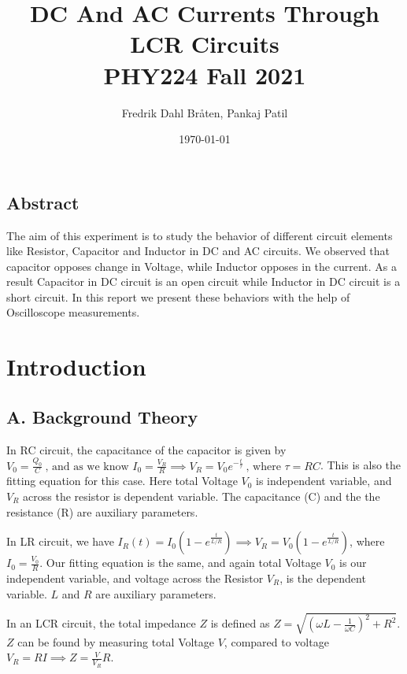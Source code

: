 \documentclass[a4paper,12pt]{article}
\begin{document}
\title{DC And AC Currents Through LCR Circuits \\
\large PHY224 Fall 2021}
\author{Fredrik Dahl Bråten, Pankaj Patil}
\date{\today}
\maketitle
\begin{center}
	\section*{Abstract}
\end{center}
The aim of this experiment is  to study the behavior of different  circuit elements like 
Resistor, Capacitor and Inductor in DC and AC circuits. We observed that capacitor opposes
change in Voltage, while Inductor opposes in the current. As a result Capacitor in DC circuit is an open
circuit while Inductor in DC circuit is a short circuit. In this report we present 
these behaviors with the help of Oscilloscope measurements.

\section{Introduction}

\subsection*{A. Background Theory}
In RC circuit, the capacitance of the capacitor is given by $V_0 = \frac{Q_0}{C} \ \text{, and as we know  } I_0 = \frac{V_R}{R} \implies V_R = V_0e^{-\frac{t}{\tau}}\ \text{, where } \tau = RC$. This is also 
the fitting equation for this case. Here total Voltage $V_0$ is independent variable, and $V_R$ across the resistor is dependent variable. The capacitance (C) and the the resistance (R) are 
auxiliary parameters.

In LR circuit, we have $I_R(t) = I_0(1-e^{\frac{t}{L/R}}) \implies V_R =  V_0(1-e^{\frac{t}{L/R}})$, where $I_0  = \frac{V_0}{R}$. Our fitting equation is the same, and again total Voltage $V_0$ is our 
independent variable, and voltage across the Resistor $V_R$, is the dependent variable. $L$ and $R$ are auxiliary parameters.

In an LCR circuit, the total impedance $Z$ is defined as $Z = \sqrt{(\omega L - \frac{1}{\omega C})^2 + R^2}$. $Z$ can be found by measuring 
total Voltage $V$, compared to voltage $V_R = RI \implies Z = \frac{V}{V_R}R$.
\end{document}
